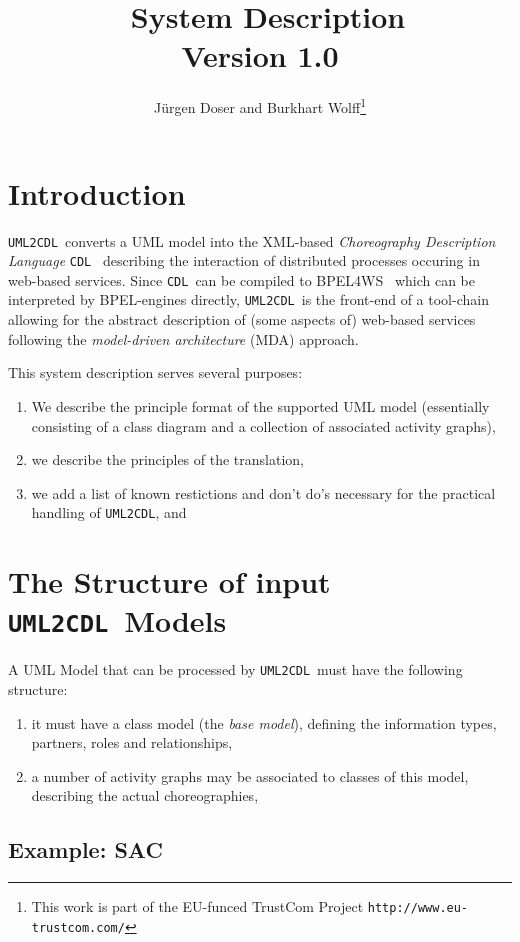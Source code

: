 \documentclass[pdftex]{scrartcl}
\title{\umlToCdl~System Description \\ Version 1.0}
\author{J\"urgen Doser and Burkhart Wolff\footnote{This work is part of the EU-funced TrustCom Project
 \texttt{http://www.eu-trustcom.com/}}}
\date{}
\newcommand{\umlToCdl}{\texttt{UML2CDL}}
\newcommand{\cdl}{\texttt{CDL}}
\begin{document}
\maketitle

\section{Introduction}
\umlToCdl\ converts a UML model into the XML-based \emph{Choreography
  Description Language} \cdl~\cite{cdl} describing the interaction of
distributed processes occuring in web-based services. Since \cdl\
can be compiled to BPEL4WS~\cite{bpel05,qiu05} which can be
interpreted by BPEL-engines directly, \umlToCdl\ is the front-end of a
tool-chain allowing for the abstract description of (some aspects of)
web-based services following the \emph{model-driven architecture}
(MDA) approach.

This system description serves several purposes:
\begin{enumerate}
\item We describe the principle format of the supported UML model
  (essentially consisting of a class diagram and a collection of
  associated activity graphs),
\item we describe the principles of the translation,
\item we add a list of known restictions and don't do's necessary for
  the practical handling of \umlToCdl, and
\end{enumerate}

\section{The Structure of input \umlToCdl\ Models}

A UML Model that can be processed by \umlToCdl\ must have the
following structure:
\begin{enumerate}
\item it must have a class model (the \emph{base model}), defining the
  information types, partners, roles and relationships,
\item a number of activity graphs may be associated to classes of this
  model, describing the actual choreographies,
\end{enumerate}

\subsection{Example: SAC}
\end{document}
